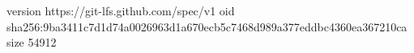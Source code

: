 version https://git-lfs.github.com/spec/v1
oid sha256:9ba3411c7d1d74a0026963d1a670ecb5c7468d989a377eddbc4360ea367210ca
size 54912
